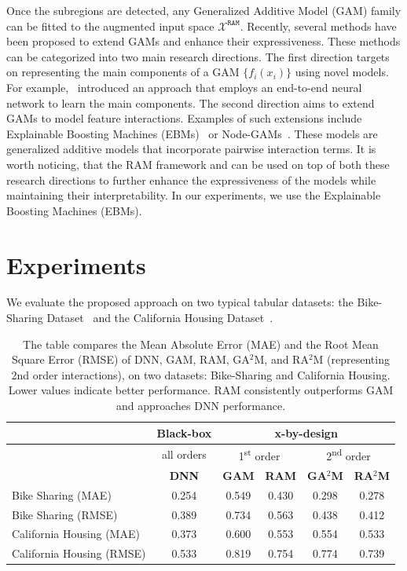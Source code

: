 \documentclass[runningheads]{llncs}
\begin{document}
Once the subregions are detected, any Generalized Additive Model (GAM) family can be fitted to the augmented input space $\mathcal{X}^{\mathtt{RAM}}$.
Recently, several methods have been proposed to extend GAMs and enhance their expressiveness.
These methods can be categorized into two main research directions.
The first direction targets on representing the main components of a GAM $\{ f_i(x_i) \}$ using novel models.
For example,~\citep{agarwal2021neural} introduced an approach that employs an end-to-end neural network to learn the main components.
The second direction aims to extend GAMs to model feature interactions.
Examples of such extensions include Explainable Boosting Machines (EBMs)~\citep{lou2013accurate} or
Node-GAMs~\citep{chang2021node}.
These models are generalized additive models that incorporate pairwise interaction terms.
It is worth noticing, that the RAM framework and can be used on top of both these research directions
to further enhance the expressiveness of the models while maintaining their interpretability.
In our experiments, we use the Explainable Boosting Machines (EBMs).

\section{Experiments}

We evaluate the proposed approach on two typical tabular datasets:
the Bike-Sharing Dataset~\citep{misc_bike_sharing_dataset_275} and the California Housing Dataset~\citep{pace1997sparse}.


\begin{table}[htbp]
  \centering
  \caption{The table compares the Mean Absolute Error (MAE) and the Root Mean Square Error (RMSE) of
  DNN, GAM, RAM, GA$^2$M, and RA$^2$M (representing 2nd order interactions), on two datasets: Bike-Sharing and California Housing.
  Lower values indicate better performance.
  RAM consistently outperforms GAM and approaches DNN performance.}
  \label{tab:sample}
  \begin{tabular}{l|c|cccc}
      & \textbf{Black-box} & \multicolumn{4}{c}{\textbf{x-by-design}} \\
      \hline
      \hline
      & all orders & \multicolumn{2}{c}{1\textsuperscript{st} order} & \multicolumn{2}{c}{2\textsuperscript{nd} order} \\
      \hline
      \hline
      & \textbf{DNN} & \textbf{GAM} & \textbf{RAM} & \textbf{GA}$^2$\textbf{M} & \textbf{RA}$^2$\textbf{M} \\
      \hline
      Bike Sharing (MAE)  & 0.254 & 0.549 & 0.430 & 0.298 & 0.278 \\
      Bike Sharing (RMSE) & 0.389 & 0.734 & 0.563 & 0.438 & 0.412 \\
      \hline
      California Housing (MAE)  & 0.373 & 0.600 & 0.553 & 0.554 & 0.533 \\
      California Housing (RMSE) & 0.533 & 0.819 & 0.754 & 0.774 & 0.739 \\
  \end{tabular}
\end{table}
\end{document}
